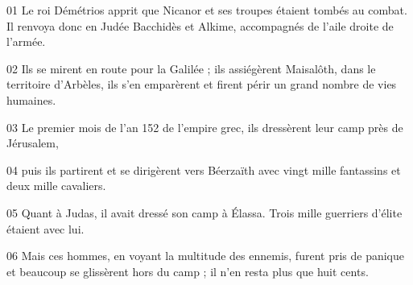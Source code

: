 01 Le roi Démétrios apprit que Nicanor et ses troupes étaient tombés au combat. Il renvoya donc en Judée Bacchidès et Alkime, accompagnés de l’aile droite de l’armée.

02 Ils se mirent en route pour la Galilée ; ils assiégèrent Maisalôth, dans le territoire d’Arbèles, ils s’en emparèrent et firent périr un grand nombre de vies humaines.

03 Le premier mois de l’an 152 de l’empire grec, ils dressèrent leur camp près de Jérusalem,

04 puis ils partirent et se dirigèrent vers Béerzaïth avec vingt mille fantassins et deux mille cavaliers.

05 Quant à Judas, il avait dressé son camp à Élassa. Trois mille guerriers d’élite étaient avec lui.

06 Mais ces hommes, en voyant la multitude des ennemis, furent pris de panique et beaucoup se glissèrent hors du camp ; il n’en resta plus que huit cents.
